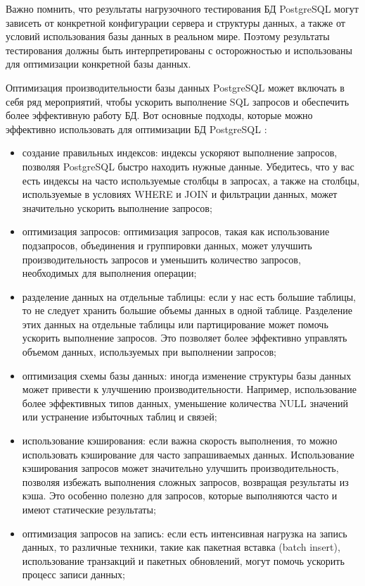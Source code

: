 Важно помнить, что результаты нагрузочного тестирования БД PostgreSQL могут зависеть от конкретной конфигурации сервера и структуры данных, а также от условий использования базы данных в реальном мире. Поэтому результаты тестирования должны быть интерпретированы с осторожностью и использованы для оптимизации конкретной базы данных.

Оптимизация производительности базы данных PostgreSQL может включать в себя ряд мероприятий, чтобы ускорить выполнение SQL запросов и обеспечить более эффективную работу БД. Вот основные подходы, которые можно эффективно использовать для оптимизации БД PostgreSQL \cite{online8, online9}:

\begin{itemize}
    \item создание правильных индексов: индексы ускоряют выполнение запросов, позволяя PostgreSQL быстро находить нужные данные. Убедитесь, что у вас есть индексы на часто используемые столбцы в запросах, а также на столбцы, используемые в условиях WHERE и JOIN и фильтрации данных, может значительно ускорить выполнение запросов;
    \item оптимизация запросов: оптимизация запросов, такая как использование подзапросов, объединения и группировки данных, может улучшить производительность запросов и уменьшить количество запросов, необходимых для выполнения операции;
    \item разделение данных на отдельные таблицы: если у нас есть большие таблицы, то не следует хранить большие объемы данных в одной таблице. Разделение этих данных на отдельные таблицы или партицирование может помочь ускорить выполнение запросов. Это позволяет более эффективно управлять объемом данных, используемых при выполнении запросов;
    \item оптимизация схемы базы данных: иногда изменение структуры базы данных может привести к улучшению производительности. Например, использование более эффективных типов данных, уменьшение количества NULL значений или устранение избыточных таблиц и связей;
    \item использование кэширования: если важна скорость выполнения, то можно использовать кэширование для часто запрашиваемых данных. Использование кэширования запросов может значительно улучшить производительность, позволяя избежать выполнения сложных запросов, возвращая результаты из кэша. Это особенно полезно для запросов, которые выполняются часто и имеют статические результаты;
    \item оптимизация запросов на запись: если есть интенсивная нагрузка на запись данных, то различные техники, такие как пакетная вставка (batch insert), использование транзакций и пакетных обновлений, могут помочь ускорить процесс записи данных;

\end{itemize}

